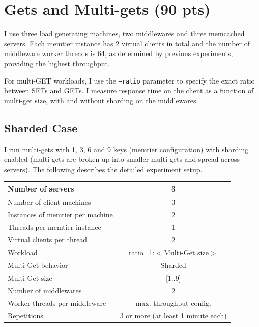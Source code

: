 \documentclass[11pt,a4paper]{article}
\begin{document}
\section{Gets and Multi-gets (90 pts)}

I use three load generating machines, two middlewares and three memcached servers. Each memtier instance has 2 virtual clients in total and the number of middleware worker threads is 64, as determined by previous experiments, providing the highest throughput.

For multi-GET workloads, I use the \texttt{--ratio} parameter to specify the exact ratio between SETs and GETs. I measure response time on the client as a function of multi-get size, with and without sharding on the middlewares.

\subsection{Sharded Case}

I run multi-gets with 1, 3, 6 and 9 keys (memtier configuration) with sharding enabled (multi-gets are broken up into smaller multi-gets and spread across servers). 
The following describes the detailed experiment setup.

\begin{center}
	\scriptsize{
		\begin{tabular}{|l|c|}
			\hline Number of servers                & 3                       \\ 
			\hline Number of client machines        & 3                       \\ 
			\hline Instances of memtier per machine & 2                       \\ 
			\hline Threads per memtier instance     & 1                       \\
			\hline Virtual clients per thread       & 2     		            \\ 
			\hline Workload                         & ratio=1:$<$Multi-Get size$>$             \\
			\hline Multi-Get behavior               & Sharded                 \\
			\hline Multi-Get size                   & [1..9]                  \\
			\hline Number of middlewares            & 2                       \\
			\hline Worker threads per middleware    & max. throughput config. \\
			\hline Repetitions                      & 3 or more (at least 1 minute each)               \\ 
			\hline 
		\end{tabular}
	} 
\end{center}
\end{document}
